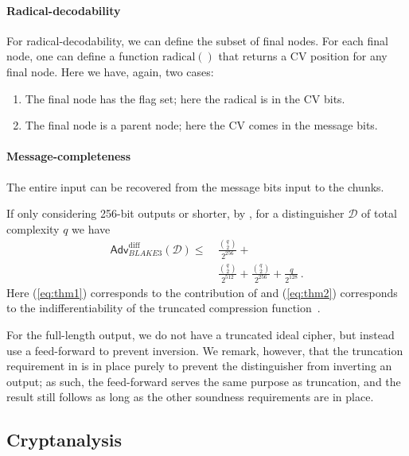 \documentclass[11pt,notitlepage,a4paper]{article}
\newcommand{\flag}[1]{\texttt{\detokenize{#1}}\xspace}
\begin{document}
\paragraph{Radical-decodability}{
  For radical-decodability, we can define the subset of final nodes. For each final node, one can define a function $\text{radical}()$ that returns a CV position for any final node. Here we have, again, two cases:
  \begin{enumerate}
    \item The final node has the \flag{CHUNK_END} flag set; here the radical is in the CV bits.
    \item The final node is a parent node; here the CV comes in the message bits.
  \end{enumerate}
}
\paragraph{Message-completeness}{
  The entire input can be recovered from the message bits input to the chunks.
}

If only considering 256-bit outputs or shorter, by \cite[Theorem~1]{DBLP:journals/tosc/DaemenMA18}, for a distinguisher $\mathcal{D}$ of total complexity $q$ we have
\begin{align}
  \mathsf{Adv}_{BLAKE3}^{\text{diff}}(\mathcal{D}) \le & ~\frac{\binom{q}{2}}{2^{256}} +\label{eq:thm1} \\
  & ~\frac{\binom{q}{2}}{2^{512}} + \frac{\binom{q}{2}}{2^{256}} + \frac{q}{2^{128}} \label{eq:thm2} \,.
\end{align}
Here (\ref{eq:thm1}) corresponds to the contribution of \cite[Theorem~1]{DBLP:journals/tosc/DaemenMA18} and (\ref{eq:thm2}) corresponds to the indifferentiability of the truncated compression function~\cite{DBLP:journals/tosc/LuykxMN16}.

For the full-length output, we do not have a truncated ideal cipher, but instead use a feed-forward to prevent inversion. We remark, however, that the truncation requirement in \cite[Theorem~3]{DBLP:journals/tosc/DaemenMA18} is in place purely to prevent the distinguisher from inverting an output; as such, the feed-forward serves the same purpose as truncation, and the result still follows as long as the other soundness requirements are in place.

\subsection{Cryptanalysis}\label{sec:cryptanalysis}
\end{document}
